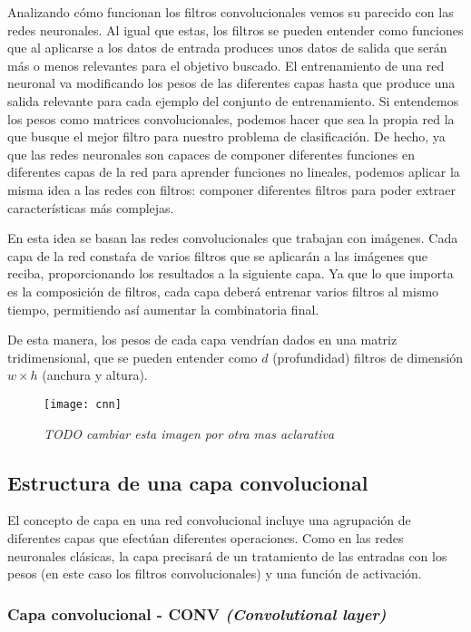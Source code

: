 Analizando cómo funcionan los filtros convolucionales vemos su parecido con las redes neuronales. Al igual que estas, los filtros se pueden entender como funciones que al aplicarse a los datos de entrada produces unos datos de salida que serán más o menos relevantes para el objetivo buscado. El entrenamiento de una red neuronal va modificando los pesos de las diferentes capas hasta que produce una salida relevante para cada ejemplo del conjunto de entrenamiento. Si entendemos los pesos como matrices convolucionales, podemos hacer que sea la propia red la que busque el mejor filtro para nuestro problema de clasificación. De hecho, ya que las redes neuronales son capaces de componer diferentes funciones en diferentes capas de la red para aprender funciones no lineales, podemos aplicar la misma idea a las redes con filtros: componer diferentes filtros para poder extraer características más complejas.

En esta idea se basan las redes convolucionales que trabajan con imágenes. Cada capa de la red constaŕa de varios filtros que se aplicarán a las imágenes que reciba, proporcionando los resultados a la siguiente capa. Ya que lo que importa es la composición de filtros, cada capa deberá entrenar varios filtros al mismo tiempo, permitiendo así aumentar la combinatoria final.

De esta manera, los pesos de cada capa vendrían dados en una matriz tridimensional, que se pueden entender como $d$ (profundidad) filtros de dimensión  $w \times h$ (anchura y altura).

\begin{figure}
    \centering
    \caption{\textit{TODO cambiar esta imagen por otra mas aclarativa}}
  \label{cnn_basic}
  \texttt{[image: cnn]}
\end{figure}


\subsection{Estructura de una capa convolucional}

El concepto de capa en una red convolucional incluye una agrupación de diferentes capas que efectúan diferentes operaciones. Como en las redes neuronales clásicas, la capa precisará de un tratamiento de las entradas con los pesos (en este caso los filtros convolucionales) y una función de activación.

\subsubsection{Capa convolucional - CONV \textit{(Convolutional layer)}}

